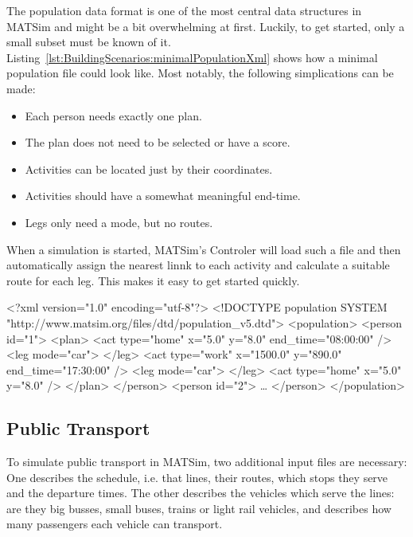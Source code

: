 \bigskip

The population data format is one of the most central data structures in
MATSim and might be a bit overwhelming at first. Luckily, to get started, only a
small subset must be known of it.
Listing~\ref{lst:BuildingScenarios:minimalPopulationXml} shows how a minimal
population file could look like. Most notably, the following simplications can
be made:
\begin{itemize}\styleItemize
  \item Each person needs exactly one plan.
  \item The plan does not need to be selected or have a score.
  \item Activities can be located just by their coordinates.
  \item Activities should have a somewhat meaningful end-time.
  \item Legs only need a mode, but no routes.
\end{itemize}
When a simulation is started, MATSim's Controler will load such a file and then
automatically assign the nearest linnk to each activity and calculate a suitable
route for each leg. This makes it easy to get started quickly.

\begin{xml-file}[caption=Minimal population.xml required to start MATSim,
label=lst:BuildingScenarios:minimalPopulationXml]
<?xml version="1.0" encoding="utf-8"?>
<!DOCTYPE population SYSTEM "http://www.matsim.org/files/dtd/population_v5.dtd">
<population>
	<person id="1">
		<plan>
			<act type="home" x="5.0" y="8.0" end_time="08:00:00" />
			<leg mode="car">
			</leg>
			<act type="work" x="1500.0" y="890.0" end_time="17:30:00" />
			<leg mode="car">
			</leg>
			<act type="home" x="5.0" y="8.0" />
		</plan>
	</person>
	<person id="2">
		\ldots
	</person>
</population>
\end{xml-file}

\subsection{Public Transport}

To simulate public transport in MATSim, two additional input files are
necessary: One describes the schedule, i.e. that lines, their routes, which
stops they serve and the departure times. The other describes the vehicles which
serve the lines: are they big busses, small buses, trains or light rail
vehicles, and describes how many passengers each vehicle can transport.

